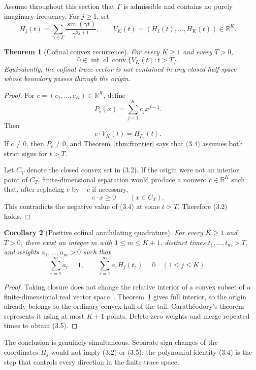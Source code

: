 \documentclass[11pt]{article}
\newtheorem{theorem}{Theorem}[section]
\newtheorem{corollary}[theorem]{Corollary}
\theoremstyle{remark}
\newcommand{\R}{\mathbb R}
\newcommand{\conv}{\operatorname{conv}}
\newcommand{\cl}{\operatorname{cl}}
\newcommand{\interior}{\operatorname{int}}
\begin{document}
Assume throughout this section that $\Gamma$ is admissible and contains no purely imaginary
frequency.  For $j\geq1$, set
\[
 H_j(t)=\sum_{\gamma\in\Gamma}
       \frac{\sin(\gamma t)}{\gamma^{2j+1}},
 \qquad
 V_K(t)=(H_1(t),\ldots,H_K(t))\in\R^K.
 \tag{3.1}
\]

\begin{theorem}[Cofinal convex recurrence]
\label{thm:convex}
For every $K\geq1$ and every $T>0$,
\[
 0\in\interior\cl\conv\{V_K(t):t>T\}.
 \tag{3.2}
\]
Equivalently, the cofinal trace vector is not contained in any closed half-space whose boundary
passes through the origin.
\end{theorem}

\begin{proof}
For $c=(c_1,\ldots,c_K)\in\R^K$, define
\[
 P_c(x)=\sum_{j=1}^K c_jx^{j-1}.
 \tag{3.3}
\]
Then
\[
 c\cdot V_K(t)=H_{P_c}(t).
 \tag{3.4}
\]
If $c\neq0$, then $P_c\neq0$, and Theorem~\ref{thm:frontier} says that (3.4) assumes both strict
signs for $t>T$.

Let $C_T$ denote the closed convex set in (3.2).  If the origin were not an interior point of
$C_T$, finite-dimensional separation would produce a nonzero $c\in\R^K$ such that, after replacing
$c$ by $-c$ if necessary,
\[
 c\cdot x\geq0\qquad(x\in C_T).
\]
This contradicts the negative value of (3.4) at some $t>T$.  Therefore (3.2) holds.
\end{proof}

\begin{corollary}[Positive cofinal annihilating quadrature]
\label{cor:quadrature}
For every $K\geq1$ and $T>0$, there exist an integer $m$ with $1\leq m\leq K+1$, distinct times
$t_1,\ldots,t_m>T$, and weights $a_1,\ldots,a_m>0$ such that
\[
 \sum_{r=1}^m a_r=1,
 \qquad
 \sum_{r=1}^m a_rH_j(t_r)=0
 \quad(1\leq j\leq K).
 \tag{3.5}
\]
\end{corollary}

\begin{proof}
Taking closure does not change the relative interior of a convex subset of a finite-dimensional
real vector space~\cite[Section 6]{Rockafellar1970}.  Theorem~\ref{thm:convex} gives full interior,
so the origin already belongs to the ordinary convex hull of the tail.  Carath\'eodory's theorem
represents it using at most $K+1$ points.  Delete zero weights and merge repeated times to obtain
(3.5).
\end{proof}

The conclusion is genuinely simultaneous.  Separate sign changes of the coordinates $H_j$ would
not imply (3.2) or (3.5); the polynomial identity (3.4) is the step that controls every direction
in the finite trace space.
\end{document}
